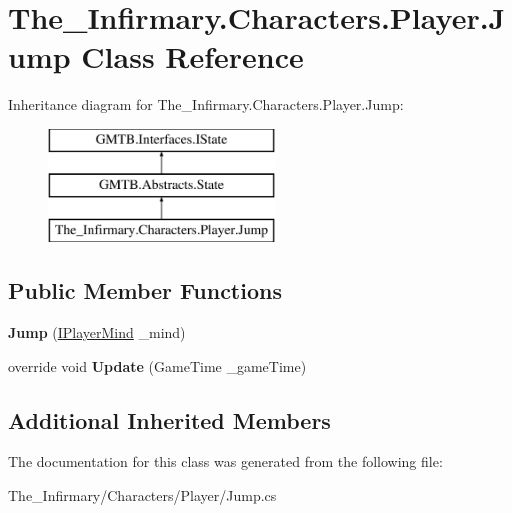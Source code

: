 \hypertarget{class_the___infirmary_1_1_characters_1_1_player_1_1_jump}{}\section{The\+\_\+\+Infirmary.\+Characters.\+Player.\+Jump Class Reference}
\label{class_the___infirmary_1_1_characters_1_1_player_1_1_jump}
Inheritance diagram for The\+\_\+\+Infirmary.\+Characters.\+Player.\+Jump\+:\begin{figure}[H]
\begin{center}
\leavevmode
\includegraphics[height=3.000000cm]{class_the___infirmary_1_1_characters_1_1_player_1_1_jump}
\end{center}
\end{figure}
\subsection*{Public Member Functions}
\begin{DoxyCompactItemize}
\item 
\mbox{\label{class_the___infirmary_1_1_characters_1_1_player_1_1_jump_ae63f38be664b26a94aa9797958f404c3}} 
{\bfseries Jump} (\mbox{\hyperlink{interface_g_m_t_b_1_1_interfaces_1_1_i_player_mind}{I\+Player\+Mind}} \+\_\+mind)
\item 
\mbox{\label{class_the___infirmary_1_1_characters_1_1_player_1_1_jump_abdf308310271cf87b83c1d4c3e9386c8}} 
override void {\bfseries Update} (Game\+Time \+\_\+game\+Time)
\end{DoxyCompactItemize}
\subsection*{Additional Inherited Members}


The documentation for this class was generated from the following file\+:\begin{DoxyCompactItemize}
\item 
The\+\_\+\+Infirmary/\+Characters/\+Player/Jump.\+cs\end{DoxyCompactItemize}
